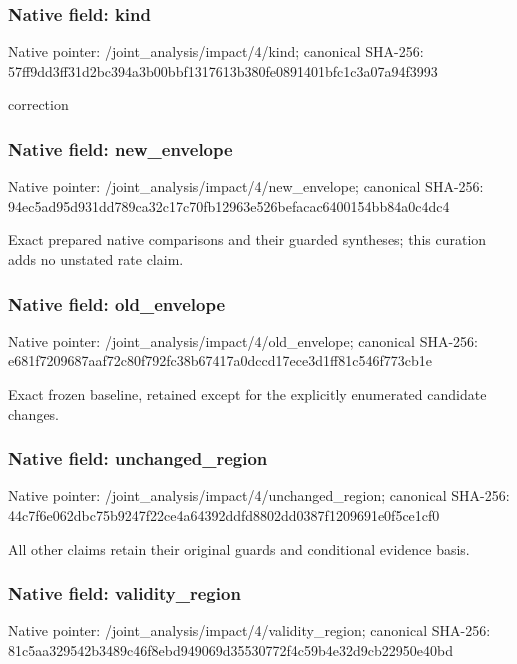 \documentclass[10pt,a4paper]{article}
\begin{document}
\subsubsection{Native field: kind}
Native pointer: /joint\_\allowbreak{}analysis/impact/4/kind; canonical SHA-256: 57ff9dd3ff31d2bc394a3b00bbf1317613b380fe0891401bfc1c3a07a94f3993

\begingroup\raggedright\sloppy correction\par\endgroup

\subsubsection{Native field: new\_\allowbreak{}envelope}
Native pointer: /joint\_\allowbreak{}analysis/impact/4/new\_\allowbreak{}envelope; canonical SHA-256: 94ec5ad95d931dd789ca32c17c70fb12963e526befacac6400154bb84a0c4dc4

\begingroup\raggedright\sloppy Exact prepared native comparisons and their guarded syntheses;\allowbreak{} this curation adds no unstated rate claim.\par\endgroup

\subsubsection{Native field: old\_\allowbreak{}envelope}
Native pointer: /joint\_\allowbreak{}analysis/impact/4/old\_\allowbreak{}envelope; canonical SHA-256: e681f7209687aaf72c80f792fc38b67417a0dccd17ece3d1ff81c546f773cb1e

\begingroup\raggedright\sloppy Exact frozen baseline,\allowbreak{} retained except for the explicitly enumerated candidate changes.\par\endgroup

\subsubsection{Native field: unchanged\_\allowbreak{}region}
Native pointer: /joint\_\allowbreak{}analysis/impact/4/unchanged\_\allowbreak{}region; canonical SHA-256: 44c7f6e062dbc75b9247f22ce4a64392ddfd8802dd0387f1209691e0f5ce1cf0

\begingroup\raggedright\sloppy All other claims retain their original guards and conditional evidence basis.\par\endgroup

\subsubsection{Native field: validity\_\allowbreak{}region}
Native pointer: /joint\_\allowbreak{}analysis/impact/4/validity\_\allowbreak{}region; canonical SHA-256: 81c5aa329542b3489c46f8ebd949069d35530772f4c59b4e32d9cb22950e40bd
\end{document}
